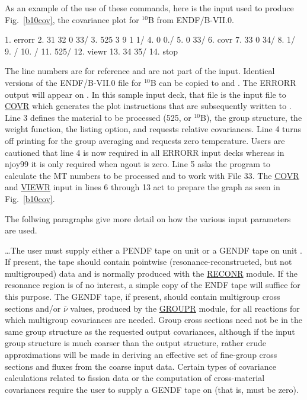 As an example of the use of these commands, here is the input used
to produce Fig.~\ref{b10cov}, the covariance plot for $^{10}$B
from ENDF/B-VII.0.

\small
\begin{ccode}

    1. errorr
    2. 31 32 0 33/
    3. 525 3 9 1 1/
    4. 0 0./
    5. 0 33/
    6. covr
    7. 33 0 34/
    8. 1/
    9. /
   10. /
   11. 525/
   12. viewr
   13. 34 35/
   14. stop

\end{ccode}
\normalsize

\noindent
The line numbers are for reference and are not part of the input.
Identical versions of the ENDF/B-VII.0 file for $^{10}$B can be
copied to  and .  The ERRORR output
will appear on .  In this sample input deck, that file
is the input file to \hyperlink{sCOVRhy}{COVR} which
generates the plot instructions that are subsequently written to
.  Line 3 defines the material to be
processed (525, or $^{10}$B), the group structure, the weight function,
the listing option, and requests relative covariances.  Line 4 turns
off printing for the group averaging and requests zero temperature.
Users are cautioned that line 4 is now required in all ERRORR input decks
whereas in njoy99 it is only required when ngout is zero.  Line 5
asks the program to calculate the MT numbers to be processed
and to work with File 33.  The \hyperlink{sCOVRhy}{COVR} and
\hyperlink{sVIEWRhy}{VIEWR} input in lines 6 through
13 act to prepare the graph as seen in Fig.~\ref{b10cov}.

The follwing paragraphs give more detail on how the various
input parameters are used.

 \ldots\hspace{.1in}The user must supply either a
PENDF tape on unit  or a GENDF
tape on unit .  If present, the  tape should
contain pointwise (resonance-reconstructed, but not multigrouped) data
and is normally produced with the
\hyperlink{sRECONRhy}{RECONR} module.  If the
resonance region is of no interest, a simple copy of the ENDF tape will
suffice for this purpose.  The GENDF tape, if present, should contain
multigroup cross sections and/or $\overline{\nu}$ values, produced by
the \hyperlink{sGROUPRhy}{GROUPR} module,
for all reactions for which multigroup
covariances are needed.  Group cross sections need not be in the same group
structure as the requested output covariances, although if the input
group structure is much coarser than the output structure, rather crude
approximations will be made in deriving an effective set of fine-group
cross sections and fluxes from the coarse input data.  Certain types
of covariance calculations related to fission data or the computation
of cross-material covariances require the user to supply a GENDF
tape on  (that is,  must be zero).

